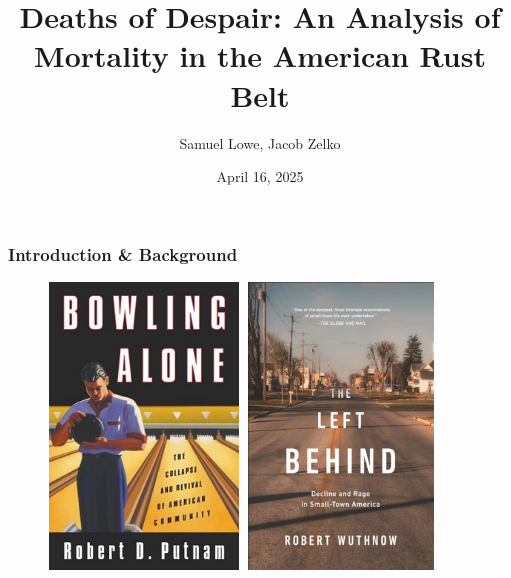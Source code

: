 \documentclass{beamer}
\title{Deaths of Despair: An Analysis of Mortality in the American Rust Belt}
\author{Samuel Lowe, Jacob Zelko}
\institute{Northeastern University}
\date{April 16, 2025}
\theoremstyle{definition}
\theoremstyle{remark}
\begin{document}
\frame{\titlepage}

\begin{frame}
    \frametitle{Introduction \& Background}

    \begin{figure}[!htb]
            \includegraphics[height=3in, width=2in]{Bowling_Alone.jpg}
        \endminipage\hfill
            \includegraphics[height=3in, width=2in]{The Left Behind.png}
        \endminipage
    \end{figure}

\end{frame}
\end{document}
